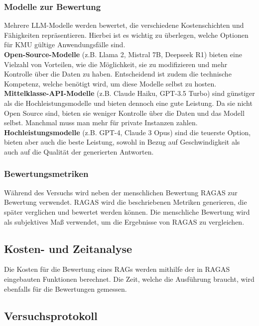 \subsubsection{Modelle zur Bewertung}
Mehrere LLM-Modelle werden bewertet, die verschiedene Kostenschichten und Fähigkeiten repräsentieren. Hierbei ist es wichtig zu überlegen, welche Optionen für KMU gültige Anwendungsfälle sind.\\
\textbf{Open-Source-Modelle} (z.B. Llama 2, Mistral 7B, Deepseek R1) bieten eine Vielzahl von Vorteilen, wie die Möglichkeit, sie zu modifizieren und mehr Kontrolle über die Daten zu haben. Entscheidend ist zudem die technische Kompetenz, welche benötigt wird, um diese Modelle selbst zu hosten.\\
\textbf{Mittelklasse-API-Modelle} (z.B. Claude Haiku, GPT-3.5 Turbo) sind günstiger als die Hochleistungsmodelle und bieten dennoch eine gute Leistung. Da sie nicht Open Source sind, bieten sie weniger Kontrolle über die Daten und das Modell selbst. Manchmal muss man mehr für private Instanzen zahlen.\\
\textbf{Hochleistungsmodelle} (z.B. GPT-4, Claude 3 Opus) sind die teuerste Option, bieten aber auch die beste Leistung, sowohl in Bezug auf Geschwindigkeit als auch auf die Qualität der generierten Antworten.\\

\subsubsection{Bewertungsmetriken}
Während des Versuchs wird neben der menschlichen Bewertung RAGAS zur Bewertung verwendet.
RAGAS wird die beschriebenen Metriken generieren, die später verglichen und bewertet werden können.
Die menschliche Bewertung wird als subjektives Maß verwendet, um die Ergebnisse von RAGAS zu vergleichen.

\subsection{Kosten- und Zeitanalyse}
Die Kosten für die Bewertung eines RAGs werden mithilfe der in RAGAS eingebauten Funktionen berechnet.
Die Zeit, welche die Ausführung braucht, wird ebenfalls für die Bewertungen gemessen.

\subsection{Versuchsprotokoll}

